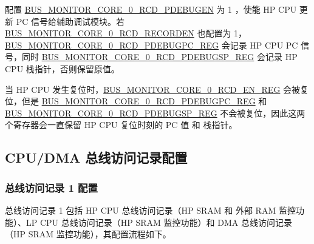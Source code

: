 \documentclass[main\_\_CN.tex]{subfiles}
\begin{document}
配置 \hyperref[fielddesc:BUSMONITORCORE0RCDPDEBUGEN]{BUS\_MONITOR\_CORE\_0\_RCD\_PDEBUGEN} 为 1 ，使能 HP CPU 更新 PC 信号给辅助调试模块。若 \hyperref[fielddesc:BUSMONITORCORE0RCDRECORDEN]{BUS\_MONITOR\_CORE\_0\_RCD\_RECORDEN} 也配置为 1，\hyperref[regdesc:BUSMONITORCORE0RCDPDEBUGPCREG]{BUS\_MONITOR\_CORE\_0\_RCD\_PDEBUGPC\_REG} 会记录 HP CPU PC 信号，同时 \hyperref[regdesc:BUSMONITORCORE0RCDPDEBUGSPREG]{BUS\_MONITOR\_CORE\_0\_RCD\_PDEBUGSP\_REG} 会记录 HP CPU 栈指针，否则保留原值。

当 HP CPU 发生复位时，\hyperref[regdesc:BUSMONITORCORE0RCDENREG]{BUS\_MONITOR\_CORE\_0\_RCD\_EN\_REG} 会被复位，但是 \hyperref[regdesc:BUSMONITORCORE0RCDPDEBUGPCREG]{BUS\_MONITOR\_CORE\_0\_RCD\_PDEBUGPC\_REG} 和 \hyperref[regdesc:BUSMONITORCORE0RCDPDEBUGSPREG]{BUS\_MONITOR\_CORE\_0\_RCD\_PDEBUGSP\_REG} 不会被复位，因此这两个寄存器会一直保留 HP CPU 复位时刻的 PC 值 和 栈指针。

\subsection{CPU/DMA 总线访问记录配置}

\subsubsection{总线访问记录 1 配置}
\label{sec:hp-cpu-access-mon}

总线访问记录 1 包括 HP CPU 总线访问记录（HP SRAM 和 外部 RAM 监控功能）、LP CPU 总线访问记录（HP SRAM 监控功能）和 DMA 总线访问记录（HP SRAM 监控功能），其配置流程如下。
\end{document}
